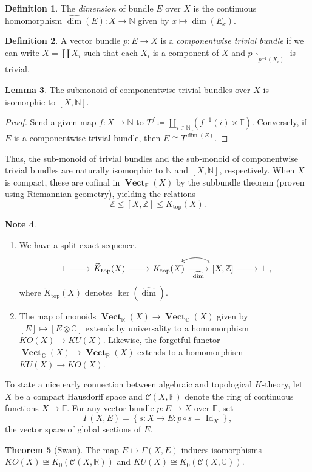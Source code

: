 \documentclass[10pt,letterpaper,cm]{nupset}
\theoremstyle{definition}
\newtheorem{definition}{Definition}[section]
\newtheorem{note}[definition]{Note}
\theoremstyle{theorem}
\newtheorem{theorem}[definition]{Theorem}
\newtheorem{lemma}[definition]{Lemma}
\theoremstyle{remark}
\newcommand{\C}{\mathbb C}
\newcommand{\F}{\mathbb F}
\newcommand{\N}{\mathbb N}
\newcommand{\R}{\mathbb R}
\newcommand{\Z}{\mathbb Z}
\newcommand{\1}{\mathbf{1}}
\newcommand{\0}{\vec 0}
\DeclareMathOperator{\id}{Id}
\DeclareMathOperator{\vect}{\mathbf{Vect}}
\DeclareMathOperator{\topp}{\mathrm{top}}
\begin{document}
\begin{definition}
The \textit{dimension} of bundle $E$ over $X$ is the continuous homomorphism $\widehat{\dim}(E) : X \to \N$ given by $x \mapsto \dim(E_x)$.
\end{definition}

\begin{definition}
A vector bundle $p: E \to X$ is a \textit{componentwise trivial bundle} if we can write $X =\coprod X_i$ such that each $X_i$ is a component of $X$ and $p\restriction_{p^{{-1}}(X_i)}$ is trivial. 
\end{definition}
\begin{lemma}
The submonoid of componentwise trivial bundles over $X$ is isomorphic to $\left[X, \N\right]$.
\end{lemma}
\begin{proof}
Send a given map $f: X \to \N$ to $T^f \coloneqq \coprod_{i \in \N}\left(f^{{-1}}(i) \times \F\right)$. Conversely, if $E$ is a componentwise trivial bundle, then $E \cong T^{\widehat{\dim}(E)}$.
\end{proof}


Thus, the sub-monoid  of trivial bundles and the sub-monoid of componentwise trivial bundles are naturally isomorphic to $\N$ and $[X, \N]$, respectively.  When $X$ is compact, these are cofinal in $\vect_{\F}(X)$ by the subbundle theorem (proven using Riemannian geometry), yielding the relations $$\Z \leq [X, \Z] \leq K_{\topp}(X).$$


\begin{note} $ $
\begin{enumerate}
\item We have a split exact sequence. 
\[
\begin{tikzcd}
1 \arrow[r] & \widetilde{K}_{\topp}(X) \arrow[r] & K_{\topp}(X) \arrow[r, "\widehat{\dim}"'] & {[X, \mathbb Z]} \arrow[r] \arrow[l, hook, bend right] & 1
\end{tikzcd},
\] where $\widetilde{K}_{\topp}(X)$ denotes $\ker\left(\widehat{\dim}\right)$.
\item The map of monoids $\vect_{\R}(X) \to \vect_{\C}(X)$ given by $\left[E\right] \mapsto \left[E \otimes \C\right]$ extends by universality to a homomorphism $KO(X) \to KU(X)$. Likewise, the forgetful functor $\vect_{\C}(X) \to \vect_{\R}(X)$ extends to a homomorphism $KU(X) \to KO(X)$.
\end{enumerate}
\end{note}

To state a nice early connection between algebraic and topological $K$-theory, let $X$ be a compact Hausdorff space and $\mathcal C(X, \F)$ denote the ring of continuous functions $X \to \F$. For any vector bundle $p: E \to X$ over $\F$, set $$\Gamma(X, E) = \left\{s: X \to E : p \circ s = \id_X\right\},$$ the vector space of global sections of $E$.

\begin{theorem}[Swan]\label{swan}
The map $E \mapsto \Gamma(X, E)$ induces isomorphisms $KO(X) \cong K_0(\mathcal C(X, \R))$ and $KU(X) \cong K_0( \mathcal C(X, \C))$.
\end{theorem}
\end{document}
